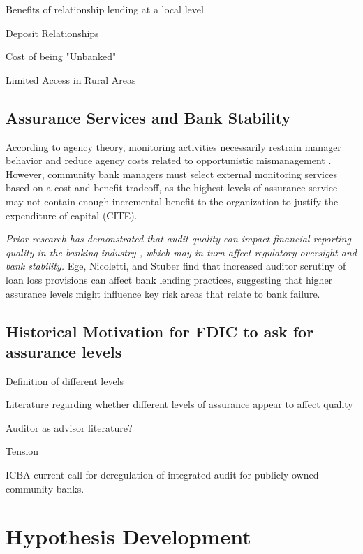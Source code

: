 \documentclass[12pt,letterpaper]{article}
\newenvironment{myquote}[1]%
  {\list{}{\leftmargin=#1\rightmargin=#1}\item[]}%
  {\endlist}
\begin{document}
Benefits of relationship lending at a local level

Deposit Relationships

Cost of being "Unbanked"

Limited Access in Rural Areas

\subsection*{Assurance Services and Bank Stability}

According to agency theory, monitoring activities necessarily restrain manager behavior and reduce agency costs related to opportunistic mismanagement \parencite{JensenMeckling1976}. However, community bank managers must select external monitoring services based on a cost and benefit tradeoff, as the highest levels of assurance service may not contain enough incremental benefit to the organization to justify the expenditure of capital (CITE).

\textit{Prior research has demonstrated that audit quality can impact financial reporting quality in the banking industry \parencite{BeckNicolettiStuber2022}, which may in turn affect regulatory oversight and bank stability.} Ege, Nicoletti, and Stuber \parencite{EgeNicolettiStuber2025} find that increased auditor scrutiny of loan loss provisions can affect bank lending practices, suggesting that higher assurance levels might influence key risk areas that relate to bank failure.

\subsection*{Historical Motivation for FDIC to ask for assurance levels}

Definition of different levels

Literature regarding whether different levels of assurance appear to affect quality

Auditor as advisor literature?

Tension

\begin{myquote}{0.5in}
ICBA current call for deregulation of integrated audit for publicly owned community banks.
\end{myquote}

\section*{Hypothesis Development}
\end{document}
